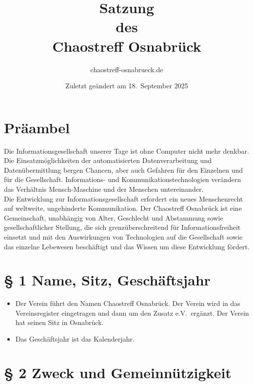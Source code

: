 \documentclass[12pt,paper=a4,ngerman]{scrreprt}
\title{Satzung\\des\\Chaostreff Osnabrück} \author{chaostreff-osnabrueck.de}
\date{Zuletzt geändert am 18.\ September 2025}
\begin{document}
\maketitle
\tableofcontents
\newpage

\section{Präambel}

Die Informationsgesellschaft unserer Tage ist ohne Computer nicht mehr
denkbar. Die Einsatzmöglichkeiten der automatisierten
Datenverarbeitung und Datenübermittlung bergen Chancen, aber auch
Gefahren für den Einzelnen und für die Gesellschaft. Infor\-mations-
und Kommunikationstechnologien verändern das Verhältnis
Mensch-Maschine und der Menschen untereinander. \\
Die Entwicklung zur Informationsgesellschaft erfordert ein neues
Menschenrecht auf weltweite, ungehinderte Kommunikation. Der
Chaostreff Osnabrück ist eine Gemeinschaft, unabhängig von Alter,
Geschlecht und Abstammung sowie gesellschaftlicher Stellung, die sich
grenzüberschreitend für Informationsfreiheit einsetzt und mit den
Auswirkungen von Technologien auf die Gesellschaft sowie das einzelne
Lebewesen beschäftigt und das Wissen um diese Entwicklung fördert.

\section{\S{} 1 Name, Sitz, Geschäftsjahr}

\begin{itemize}
\item[(1)]
Der Verein führt den Namen \glqq Chaostreff
Osnabrück\grqq. Der Verein wird in das Vereinsregister eingetragen und
dann um den Zusatz \glqq e.V.\grqq\ ergänzt. Der Verein hat seinen
Sitz in Osnabrück.
\item[(2)]
Das Geschäftsjahr ist das Kalenderjahr.
\end{itemize}

\section{\S{} 2 Zweck und Gemeinnützigkeit}
\end{document}
